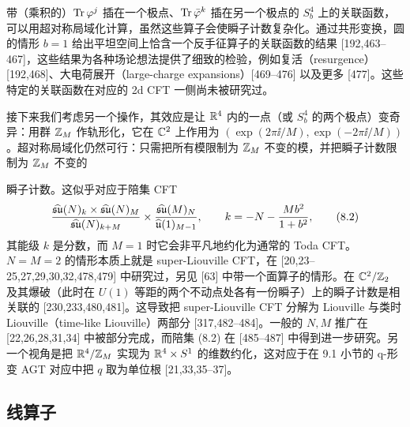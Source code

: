带（乘积的）$\operatorname{Tr}\varphi^j$ 插在一个极点、$\operatorname{Tr}\bar\varphi^k$ 插在另一个极点的 $S^4_b$ 上的关联函数，可以用超对称局域化计算，虽然这些算子会使瞬子计数复杂化。通过共形变换，圆的情形 $b=1$ 给出平坦空间上恰含一个反手征算子的关联函数的结果 [192,463--467]，这些结果为各种场论想法提供了细致的检验，例如复活（resurgence）[192,468]、大电荷展开（large-charge expansions）[469--476] 以及更多 [477]。这些特定的关联函数在对应的 2d CFT 一侧尚未被研究过。

 接下来我们考虑另一个操作，其效应是让 $\mathbb{R}^4$ 内的一点（或 $S^4_b$ 的两个极点）变奇异：用群 $\mathbb{Z}_M$ 作轨形化，它在 $\mathbb{C}^2$ 上作用为 $(\exp(2\pi\ii/M),\exp(-2\pi\ii/M))$。超对称局域化仍然可行：只需把所有模限制为 $\mathbb{Z}_M$ 不变的模，并把瞬子计数限制为 $\mathbb{Z}_M$ 不变的

瞬子计数。这似乎对应于陪集 CFT
\begin{equation}
    \frac{\widehat{\mathfrak{su}}(N)_k\times\widehat{\mathfrak{su}}(N)_M}{\widehat{\mathfrak{su}}(N)_{k+M}}\times\frac{\widehat{\mathfrak{su}}(M)_N}{\widehat{\mathfrak{u}}(1)_{M-1}},
    \qquad k=-N-\frac{Mb^2}{1+b^2},
    \tag{8.2}
\end{equation}
其能级 $k$ 是分数，而 $M=1$ 时它会非平凡地约化为通常的 Toda CFT。$N=M=2$ 的情形本质上就是 super-Liouville CFT，在 [20,23--25,27,29,30,32,478,479] 中研究过，另见 [63] 中带一个面算子的情形。在 $\mathbb{C}^2/\mathbb{Z}_2$ 及其爆破（此时在 $U(1)$ 等距的两个不动点处各有一份瞬子）上的瞬子计数是相关联的 [230,233,480,481]。这导致把 super-Liouville CFT 分解为 Liouville 与类时 Liouville（time-like Liouville）两部分 [317,482--484]。一般的 $N,M$ 推广在 [22,26,28,31,34] 中被部分完成，而陪集 (8.2) 在 [485--487] 中得到进一步研究。另一个视角是把 $\mathbb{R}^4/\mathbb{Z}_M$ 实现为 $\mathbb{R}^4\times S^1$ 的维数约化，这对应于在 9.1 小节的 q-形变 AGT 对应中把 $q$ 取为单位根 [21,33,35--37]。

\subsection{线算子}

